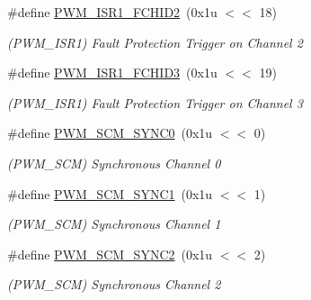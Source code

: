 \begin{DoxyCompactItemize}
\#define \mbox{\hyperlink{group__SAMV71__PWM_gaff4258f3fafae81aa9d871e8bf9d656e}{P\+W\+M\+\_\+\+I\+S\+R1\+\_\+\+F\+C\+H\+I\+D2}}~(0x1u $<$$<$ 18)
\begin{DoxyCompactList}\small\item\em (P\+W\+M\+\_\+\+I\+S\+R1) Fault Protection Trigger on Channel 2 \end{DoxyCompactList}\item 
\mbox{\label{group__SAMV71__PWM_gad44b49b584c2c3f42c4b3ca78d9e86bf}} 
\#define \mbox{\hyperlink{group__SAMV71__PWM_gad44b49b584c2c3f42c4b3ca78d9e86bf}{P\+W\+M\+\_\+\+I\+S\+R1\+\_\+\+F\+C\+H\+I\+D3}}~(0x1u $<$$<$ 19)
\begin{DoxyCompactList}\small\item\em (P\+W\+M\+\_\+\+I\+S\+R1) Fault Protection Trigger on Channel 3 \end{DoxyCompactList}\item 
\mbox{\label{group__SAMV71__PWM_gaba5a800dc0108c6efdf60e6e87946071}} 
\#define \mbox{\hyperlink{group__SAMV71__PWM_gaba5a800dc0108c6efdf60e6e87946071}{P\+W\+M\+\_\+\+S\+C\+M\+\_\+\+S\+Y\+N\+C0}}~(0x1u $<$$<$ 0)
\begin{DoxyCompactList}\small\item\em (P\+W\+M\+\_\+\+S\+CM) Synchronous Channel 0 \end{DoxyCompactList}\item 
\mbox{\label{group__SAMV71__PWM_ga8238b59e1eedc70791a3c2ac21b6198c}} 
\#define \mbox{\hyperlink{group__SAMV71__PWM_ga8238b59e1eedc70791a3c2ac21b6198c}{P\+W\+M\+\_\+\+S\+C\+M\+\_\+\+S\+Y\+N\+C1}}~(0x1u $<$$<$ 1)
\begin{DoxyCompactList}\small\item\em (P\+W\+M\+\_\+\+S\+CM) Synchronous Channel 1 \end{DoxyCompactList}\item 
\mbox{\label{group__SAMV71__PWM_ga10d1db9baeea99e727a31c8968e3a5f7}} 
\#define \mbox{\hyperlink{group__SAMV71__PWM_ga10d1db9baeea99e727a31c8968e3a5f7}{P\+W\+M\+\_\+\+S\+C\+M\+\_\+\+S\+Y\+N\+C2}}~(0x1u $<$$<$ 2)
\begin{DoxyCompactList}\small\item\em (P\+W\+M\+\_\+\+S\+CM) Synchronous Channel 2 \end{DoxyCompactList}\item 
$$
\end{DoxyCompactItemize}
